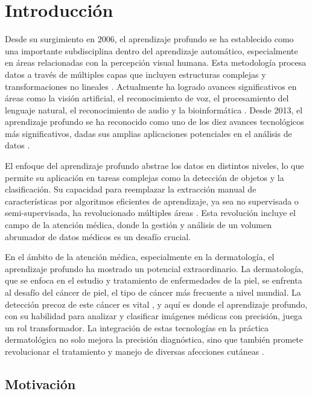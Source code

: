 \chapter*{Introducción}\label{chapter:introduction}

Desde su surgimiento en 2006, el aprendizaje profundo se ha establecido como una importante subdisciplina dentro del aprendizaje automático, especialmente en áreas relacionadas con la percepción visual humana. Esta metodología procesa datos a través de múltiples capas que incluyen estructuras complejas y transformaciones no lineales . Actualmente ha logrado avances significativos en áreas como la visión artificial, el reconocimiento de voz, el procesamiento del lenguaje natural, el reconocimiento de audio y la bioinformática . Desde 2013, el aprendizaje profundo se ha reconocido como uno de los diez avances tecnológicos más significativos, dadas sus amplias aplicaciones potenciales en el análisis de datos .

El enfoque del aprendizaje profundo abstrae los datos en distintos niveles, lo que permite su aplicación en tareas complejas como la detección de objetos y la clasificación. Su capacidad para reemplazar la extracción manual de características por algoritmos eficientes de aprendizaje, ya sea no supervisada o semi-supervisada, ha revolucionado múltiples áreas . Esta revolución incluye el campo de la atención médica, donde la gestión y análisis de un volumen abrumador de datos médicos es un desafío crucial.

En el ámbito de la atención médica, especialmente en la dermatología, el aprendizaje profundo ha mostrado un potencial extraordinario. La dermatología, que se enfoca en el estudio y tratamiento de enfermedades de la piel, se enfrenta al desafío del cáncer de piel, el tipo de cáncer más frecuente a nivel mundial. La detección precoz de este cáncer es vital , y aquí es donde el aprendizaje profundo, con su habilidad para analizar y clasificar imágenes médicas con precisión, juega un rol transformador. La integración de estas tecnologías en la práctica dermatológica no solo mejora la precisión diagnóstica, sino que también promete revolucionar el tratamiento y manejo de diversas afecciones cutáneas .

\section*{Motivación}

